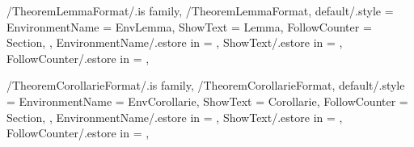 \newcommand{\InitTheoremExampleFormat}
{%
  \theoremstyle{definition}%
  \ifthenelse{\equal{\GetTheoremExampleFormatFollowCounter}{\empty}}%
  {%
    \newtheorem{%
      \GetTheoremExampleFormatEnvironmentName}{%
      \GetTheoremExampleFormatShowText}%
  }%
  {%
    \MappingTheoremCounter[Example]{\GetTheoremExampleFormatFollowCounter}%
    \newtheorem{%
      \GetTheoremExampleFormatEnvironmentName}{%
      \GetTheoremExampleFormatShowText}[%
      \GetTheoremExampleFormatFollowCounter]%
  }%
} %


\pgfkeys
{
  /TheoremLemmaFormat/.is family, /TheoremLemmaFormat,
  default/.style =
  {
    EnvironmentName = {EnvLemma},
    ShowText = {Lemma},
    FollowCounter = Section,
  },
  EnvironmentName/.estore in = \GetTheoremLemmaFormatEnvironmentName,
  ShowText/.estore in = \GetTheoremLemmaFormatShowText,
  FollowCounter/.estore in = \GetTheoremLemmaFormatFollowCounter,
} %

\newcommand{\InsertLemma}[2][\empty]
{%
  \InsertTheoremContent[#1]{\GetTheoremLemmaFormatEnvironmentName}{#2}%
} %

\newcommand{\InitTheoremLemmaFormat}
{%
  \theoremstyle{plain}%
  \ifthenelse{\equal{\GetTheoremLemmaFormatFollowCounter}{\empty}}%
  {%
    \newtheorem{%
      \GetTheoremLemmaFormatEnvironmentName}{%
      \GetTheoremLemmaFormatShowText}%
  }%
  {%
    \MappingTheoremCounter[Lemma]{\GetTheoremLemmaFormatFollowCounter}%
    \newtheorem{%
      \GetTheoremLemmaFormatEnvironmentName}{%
      \GetTheoremLemmaFormatShowText}[%
      \GetTheoremLemmaFormatFollowCounter]%
  }%
} %


\pgfkeys
{
  /TheoremCorollarieFormat/.is family, /TheoremCorollarieFormat,
  default/.style =
  {
    EnvironmentName = {EnvCorollarie},
    ShowText = {Corollarie},
    FollowCounter = Section,
  },
  EnvironmentName/.estore in = \GetTheoremCorollarieFormatEnvironmentName,
  ShowText/.estore in = \GetTheoremCorollarieFormatShowText,
  FollowCounter/.estore in = \GetTheoremCorollarieFormatFollowCounter,
} %

\newcommand{\InsertCorollarie}[2][\empty]
{%
  \InsertTheoremContent[#1]{\GetTheoremCorollarieFormatEnvironmentName}{#2}%
} %

